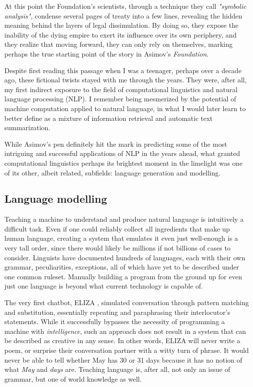 At this point the Foundation's scientists, through a technique they call \emph{"symbolic analysis"}, condense several pages of treaty into a few lines, revealing the hidden meaning behind the layers of legal dissimulation. By doing so, they expose the inability of the dying empire to exert its influence over its own periphery, and they realize that moving forward, they can only rely on themselves, marking perhaps the true starting point of the story in Asimov's \emph{Foundation}.

Despite first reading this passage when I was a teenager, perhaps over a decade ago, these fictional twists stayed with me through the years. They were, after all, my first indirect exposure to the field of computational linguistics and natural language processing (NLP). I remember being mesmerized by the potential of machine computation applied to natural language, in what I would later learn to better define as a mixture of information retrieval and automatic text summarization.

While Asimov's pen definitely hit the mark in predicting some of the most intriguing and successful applications of NLP in the years ahead, what granted computational linguistics perhaps its brightest moment in the limelight was one of its other, albeit related, subfields: language generation and modelling.

\subsection{Language modelling}

Teaching a machine to understand and produce natural language is intuitively a difficult task. Even if one could reliably collect all ingredients that make up human language, creating a system that emulates it even just well-enough is a very tall order, since there would likely be millions if not billions of cases to consider. Linguists have documented hundreds of languages, each with their own grammar, peculiarities, exceptions, all of which have yet to be described under one common ruleset. Manually building a program from the ground up for even just one language is beyond what current technology is capable of.

The very first chatbot, ELIZA \citep{citationneeded}, simulated conversation through pattern matching and substitution, essentially repeating and paraphrasing their interlocutor's statements. While it successfully bypasses the necessity of programming a machine with \emph{intelligence}, such an approach does not result in a system that can be described as creative in any sense. In other words, ELIZA will never write a poem, or surprise their conversation partner with a witty turn of phrase. It would never be able to tell whether May has 30 or 31 days because it has no notion of what \emph{May} and \emph{days} are. Teaching language is, after all, not only an issue of grammar, but one of world knowledge as well.

